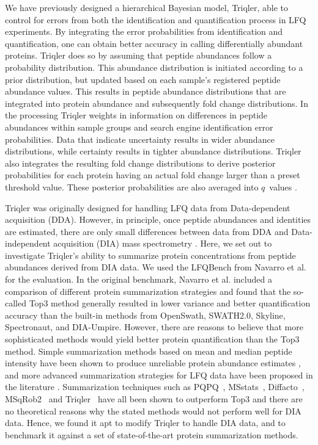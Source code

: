 \documentclass[10pt,letterpaper]{article}
\begin{document}
We have previously designed a hierarchical Bayesian model, Triqler, able to control for errors from both the identification and quantification process in LFQ experiments\cite{the2019integrated}. By integrating the error probabilities from identification and quantification, one can obtain better accuracy in calling differentially abundant proteins. Triqler does so by assuming that peptide abundances follow a probability distribution. This abundance distribution is initiated according to a prior distribution, but updated based on each sample's registered peptide abundance values. This results in peptide abundance distributions that are integrated into protein abundance and subsequently fold change distributions. In the processing Triqler weights in information on differences in peptide abundances within sample groups and search engine identification error probabilities. Data that indicate uncertainty results in wider abundance distributions, while certainty results in tighter abundance distributions. Triqler also integrates the resulting fold change distributions to derive posterior probabilities for each protein having an actual fold change larger than a preset threshold value. These posterior probabilities are also averaged into $q$~values \cite{the2019integrated}.

Triqler was originally designed for handling LFQ data from Data-dependent acquisition (DDA). However, in principle, once peptide abundances and identities are estimated, there are only small differences between data from DDA and Data-independent acquisition (DIA) mass spectrometry \cite{venable2004automated}. Here, we set out to investigate Triqler's ability to summarize protein concentrations from peptide abundances derived from DIA data. We used the LFQBench from Navarro et al. \cite{navarro2016multicenter} for the evaluation. In the original benchmark, Navarro et al. included a comparison of different protein summarization strategies and found that the so-called Top3 method generally resulted in lower variance and better quantification accuracy than the built-in methods from OpenSwath, SWATH2.0, Skyline, Spectronaut, and DIA-Umpire\cite{navarro2016multicenter}. However, there are reasons to believe that more sophisticated methods would yield better protein quantification than the Top3 method. Simple summarization methods based on mean and median peptide intensity have been shown to produce unreliable protein abundance estimates \cite{goeminne2015summarization}, and more advanced summarization strategies for LFQ data have been proposed in the literature \cite{silva2006absolute,cox2014accurate}. Summarization techniques such as PQPQ~\cite{forshed2011enhanced}, MSstats~\cite{choi2014msstats}, Diffacto~\cite{zhang2017covariation}, MSqRob2~\cite{sticker2020robust} and Triqler~\cite{the2019integrated} have all been shown to outperform Top3 and there are no theoretical reasons why the stated methods would not perform well for DIA data. Hence, we found it apt to modify Triqler to handle DIA data, and to benchmark it against a set of state-of-the-art protein summarization methods.
 
\end{document}
